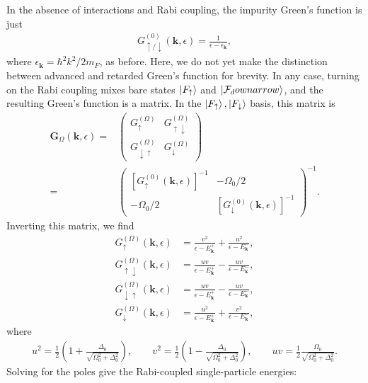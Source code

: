 \documentclass{article}
\theoremstyle{definition}
\newcommand{\F}{\mathcal{F}}
\newcommand{\f}[2]{\frac{#1}{#2}}
\newcommand{\lp}{\left(}
\newcommand{\rp}{\right)}
\begin{document}
In the absence of interactions and Rabi coupling, the impurity Green's function is just 
\begin{align}
G^{(0)}_{\uparrow/\downarrow} (\mathbf{k}, \epsilon) = \f{1}{ \epsilon - \epsilon_\mathbf{k}},
\end{align}
where $\epsilon_\mathbf{k} = \hbar^2 k^2 / 2m_F$, as before. Here, we do not yet make the distinction between advanced and retarded Green's function for brevity. In any case, turning on the Rabi coupling mixes bare states $\ket{F_\uparrow}$ and $\ket{\F_downarrow}$, and the resulting Green's function is a matrix. In the $\ket{F_\uparrow}, \ket{F_\downarrow}$ basis, this matrix is 
\begin{align}
\mathbf{G}_\Omega (\mathbf{k}, \epsilon) 
=& 
\begin{pmatrix}
G^{(\Omega)}_\uparrow & G^{(\Omega)}_{\uparrow\downarrow}  \\
G^{(\Omega)}_{\downarrow\uparrow}  & G^{(\Omega)}_\downarrow 
\end{pmatrix} \\
=&
\begin{pmatrix}
[G^{(0)}_{\uparrow} (\mathbf{k}, \epsilon)]^{-1} & -\Omega_0/2 \\ 
-\Omega_0/2  & [G^{(0)}_{\downarrow} (\mathbf{k}, \epsilon)]^{-1}
\end{pmatrix}^{-1}.
\end{align}
Inverting this matrix, we find
\begin{align}
G^{(\Omega)}_\uparrow (\mathbf{k}, \epsilon) 
&= \f{v^2}{\epsilon - E_\mathbf{k}^+}  + \f{u^2}{\epsilon - E_\mathbf{k}^-},\\
G^{(\Omega)}_{\uparrow\downarrow} (\mathbf{k}, \epsilon) 
&= \f{uv}{\epsilon - E_\mathbf{k}^+}  - \f{uv}{\epsilon - E_\mathbf{k}^-},\\
G^{(\Omega)}_{\downarrow\uparrow} (\mathbf{k}, \epsilon) 
&= \f{uv}{\epsilon - E_\mathbf{k}^+}  - \f{uv}{\epsilon - E_\mathbf{k}^-},\\
G^{(\Omega)}_\downarrow (\mathbf{k}, \epsilon) &= \f{u^2}{\epsilon - E_\mathbf{k}^+}  + \f{v^2}{\epsilon - E_\mathbf{k}^-},
\end{align}
where 
\begin{align}
u^2 = \f{1}{2}\lp 1 + \f{\Delta_0}{\sqrt{\Omega_0^2 + \Delta_0^2}} \rp,
\quad\quad
v^2 = \f{1}{2}\lp 1 - \f{\Delta_0}{\sqrt{\Omega_0^2 + \Delta_0^2}} \rp,
\quad\quad
uv = \f{1}{2}\f{\Omega_0}{\sqrt{\Omega_0^2 + \Delta_0^2}}.
\end{align}
Solving for the poles give the Rabi-coupled single-particle energies:
\end{document}
